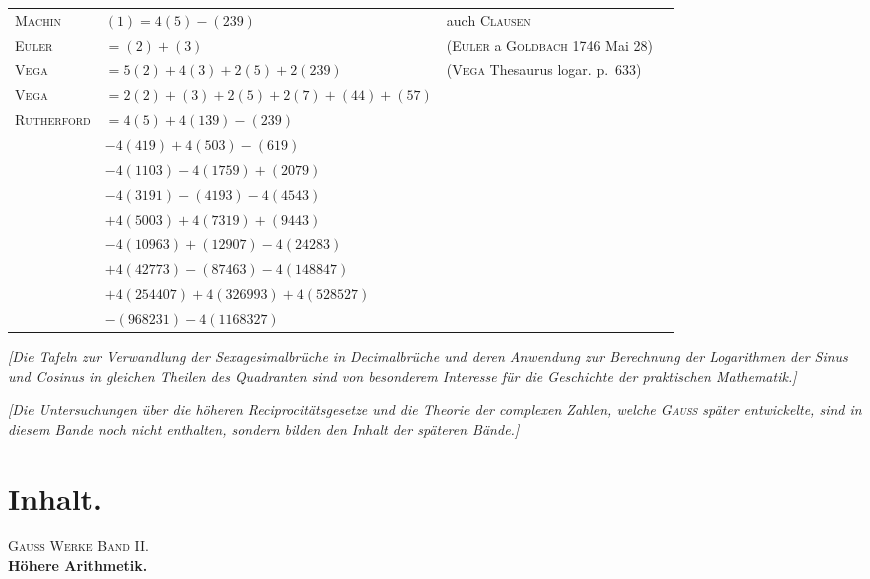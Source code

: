 \documentclass[10pt,a4paper]{article}
\begin{document}
\begin{center}
\small
\begin{tabular}{l l l l}
\textsc{Machin} & $(1) = 4(5) - (239)$ & auch \textsc{Clausen} \\
\textsc{Euler} & $= (2) + (3)$ & (\textsc{Euler} a \textsc{Goldbach} 1746 Mai 28) \\
\textsc{Vega} & $= 5(2) + 4(3) + 2(5) + 2(239)$ & (\textsc{Vega} Thesaurus logar. p.~633) \\
\textsc{Vega} & $= 2(2) + (3) + 2(5) + 2(7) + (44) + (57)$ & \\
\textsc{Rutherford} & $= 4(5) + 4(139) - (239)$ & \\
& $- 4(419) + 4(503) - (619)$ & \\
& $- 4(1103) - 4(1759) + (2079)$ & \\
& $- 4(3191) - (4193) - 4(4543)$ & \\
& $+ 4(5003) + 4(7319) + (9443)$ & \\
& $- 4(10963) + (12907) - 4(24283)$ & \\
& $+ 4(42773) - (87463) - 4(148847)$ & \\
& $+ 4(254407) + 4(326993) + 4(528527)$ & \\
& $- (968231) - 4(1168327)$ & \\
\end{tabular}
\end{center}

\medskip

\textit{[Die Tafeln zur Verwandlung der Sexagesimalbr\"uche in Decimalbr\"uche und deren Anwendung zur Berechnung der Logarithmen der Sinus und Cosinus in gleichen Theilen des Quadranten sind von besonderem Interesse f\"ur die Geschichte der praktischen Mathematik.]}

\medskip

\textit{[Die Untersuchungen \"uber die h\"oheren Reciprocit\"atsgesetze und die Theorie der complexen Zahlen, welche \textsc{Gau\ss} sp\"ater entwickelte, sind in diesem Bande noch nicht enthalten, sondern bilden den Inhalt der sp\"ateren B\"ande.]}

\newpage

\section{Inhalt.}

\begin{center}
\Large\textsc{Gau\ss{} Werke Band II.}\\[1ex]
\normalsize\textbf{H\"ohere Arithmetik.}
\end{center}
\end{document}
